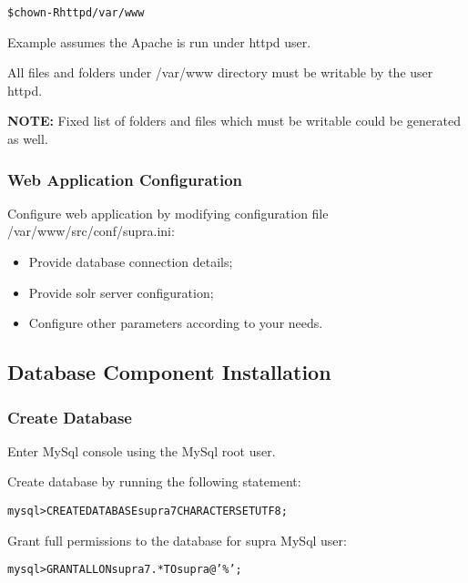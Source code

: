 \documentclass[12pt]{article}
\newcommand{\vigShowNotes}{1}
\newcommand{\vigProjectNameShort}{supra7}
\newcommand{\vigPathToProject}{/var/www}
\newcommand{\vigPathToSrc}{/src}
\newcommand{\note}[1]{
\textbf{NOTE:} 
#1
}
\begin{document}
\begin{alltt}
\$ chown -R httpd \vigPathToProject
\end{alltt}

Example assumes the Apache is run under \textsf{httpd} user.

All files and folders under \textsf{\vigPathToProject} directory must be writable by the user \textsf{httpd}.

\note{Fixed list of folders and files which must be writable could be generated as well.}

\subsubsection{Web Application Configuration}
Configure web application by modifying configuration file \textsf{\vigPathToProject\vigPathToSrc/conf/supra.ini}:

\begin{itemize}
	\item Provide database connection details;
	\item Provide \textsf{solr} server configuration;
	\item Configure other parameters according to your needs.
\end{itemize}

\subsection{Database Component Installation}

\subsubsection{Create Database}

Enter MySql console using the MySql root user.

Create database by running the following statement:

\begin{alltt}
mysql> CREATE DATABASE \vigProjectNameShort CHARACTER SET UTF8;
\end{alltt}

Grant full permissions to the database for \textsf{supra} MySql user:

\begin{alltt}
mysql> GRANT ALL ON \vigProjectNameShort.* TO supra@'\%';
\end{alltt}
\end{document}
